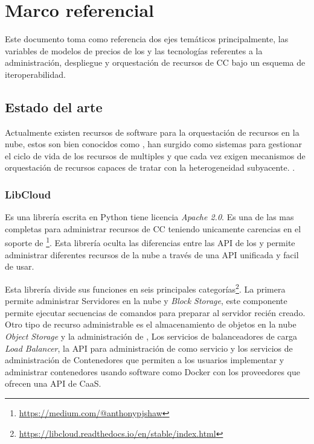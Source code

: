 
\chapter{Marco referencial} %

\label{ch:marcoReferencial} %

Este documento toma como referencia dos ejes temáticos principalmente, las variables de modelos de precios de los  y las tecnologías referentes a la administración, despliegue y orquestación de recursos de \acrshort{CC} bajo un esquema de iteroperabilidad.\bigskip

\section{Estado del arte}
Actualmente existen recursos de software para la orquestación de recursos en la nube, estos son bien conocidos como , han surgido como sistemas para gestionar el ciclo de vida de los recursos de multiples  y que cada vez exigen mecanismos de orquestación de recursos capaces de tratar con la heterogeneidad subyacente. \cite{tomarchio2020cloud}.\bigskip

\subsection{LibCloud}
Es una librería escrita en Python tiene licencia \emph{Apache 2.0}. Es una de las mas completas para administrar recursos de \acrshort{CC} teniendo unicamente carencias en el soporte de  \footnote{\hyperref{https://medium.com/@anthonypjshaw/multi-cloud-what-are-the-options-part-1-low-level-abstraction-libraries-ce500f29120f}{}{}{https://medium.com/@anthonypjshaw}}. Esta librería oculta las diferencias entre las API de los  y permite administrar diferentes recursos de la nube a través de una \acrshort{API} unificada y facil de usar. \bigskip

Esta librería divide sus funciones en seis principales categorías\footnote{\url{https://libcloud.readthedocs.io/en/stable/index.html}}. La primera permite administrar Servidores en la nube y \emph{Block Storage}, este componente permite ejecutar secuencias de comandos para preparar al servidor recién creado. Otro tipo de recurso administrable es el almacenamiento de objetos en la nube \emph{Object Storage} y la administración de , Los servicios de balanceadores de carga \emph{Load Balancer}, la \acrshort{API} para administración de  como servicio y los servicios de administración de Contenedores que permiten a los usuarios implementar y administrar contenedores usando software como \gls{Docker} con los proveedores que ofrecen una \acrshort{API} de \acrshort{CaaS}.

